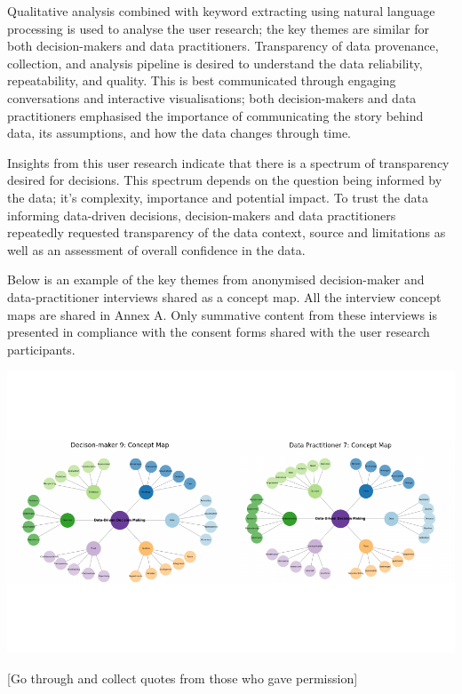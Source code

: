 \documentclass{article}
\begin{document}
Qualitative analysis combined with keyword extracting using natural
language processing is used to analyse the user research; the key themes
are similar for both decision-makers and data practitioners.
Transparency of data provenance, collection, and analysis pipeline is
desired to understand the data reliability, repeatability, and quality.
This is best communicated through engaging conversations and interactive
visualisations; both decision-makers and data practitioners emphasised
the importance of communicating the story behind data, its assumptions,
and how the data changes through time.

Insights from this user research indicate that there is a spectrum of
transparency desired for decisions. This spectrum depends on the
question being informed by the data; it's complexity, importance and
potential impact. To trust the data informing data-driven decisions,
decision-makers and data practitioners repeatedly requested transparency
of the data context, source and limitations as well as an assessment of
overall confidence in the data.

Below is an example of the key themes from anonymised decision-maker and
data-practitioner interviews shared as a concept map. All the interview
concept maps are shared in Annex A. Only summative content from these
interviews is presented in compliance with the consent forms shared with
the user research participants.

\vspace{-1cm}

\includegraphics{210431461_CSC8639_Dissertation_files/figure-latex/ConceptMapExample-1.pdf}
\vspace{-1cm}

{[}Go through and collect quotes from those who gave permission{]}
\end{document}
